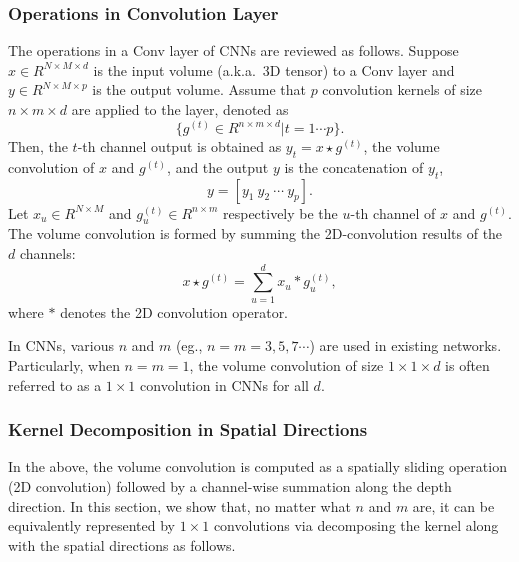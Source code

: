 \documentclass{article}
\begin{document}
	\subsubsection{Operations in Convolution Layer}
	The operations in a Conv layer of CNNs are reviewed as follows.
	Suppose $x\in R^{N\times M \times d}$ is the input volume (a.k.a.~3D tensor) to a Conv layer and $y\in R^{N\times M \times p}$ is the output volume.
	Assume that $p$ convolution kernels of size $n\times m \times d$ are applied to the layer, denoted as
	\begin{equation}
	\label{eq0}
	\{g^{(t)}\in R^{n\times m \times d} | t=1\cdots p\}.
	\end{equation}
	Then, the $t$-th channel output is obtained as $y_t=x \star g^{(t)}$, the volume convolution of $x$ and $g^{(t)}$,
	and the output $y$ is the concatenation of $y_t$,
	\begin{equation}
	\label{eq1.1}
	y =[y_{1}~y_{2}~\cdots~y_{p}].
	\end{equation}
	Let $x_u\in R^{N\times M}$ and $g_u^{(t)}\in R^{n\times m}$ respectively be the $u$-th channel of $x$ and $g^{(t)}$.  %
	The volume convolution is formed by summing the 2D-convolution results of the $d$ channels:
	\begin{equation}
	\label{eq1.5}
	x\star g^{(t)}=\sum_{u=1}^{d} x_u\ast g_u^{(t)},
	\end{equation}
	where $\ast$ denotes the 2D convolution operator.
	
	In CNNs, various $n$ and $m$ (eg., $n=m=3, 5, 7 \cdots$) are used in existing networks.
	Particularly, when $n=m=1$, the volume convolution of size $1\times 1 \times d$ is often referred to as a $1\times 1$ convolution in CNNs for all $d$.
	
	\subsubsection{Kernel Decomposition in Spatial Directions}
	In the above, the volume convolution is computed as a spatially sliding operation (2D convolution) followed by a channel-wise summation along the depth direction.
	In this section, we show that, no matter what $n$ and $m$ are, it can be equivalently represented by $1\times 1$ convolutions via decomposing the kernel along with the spatial directions as follows.
	
\end{document}
